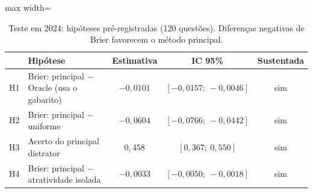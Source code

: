 \begin{table}[ht]
\centering
\caption{Teste em 2024: hipóteses pré-registradas (120 questões). Diferenças negativas de Brier favorecem o método principal.}\label{tab:hipoteses}
\small
\begin{adjustbox}{max width=\linewidth}
\begin{tabular}{llccc}
\toprule
 & Hipótese & Estimativa & IC 95\% & Sustentada \\
\midrule
H1 & Brier: principal $-$ Oracle (usa o gabarito) & $-0{,}0101$ & $[-0{,}0157;\ -0{,}0046]$ & sim \\
H2 & Brier: principal $-$ uniforme & $-0{,}0604$ & $[-0{,}0766;\ -0{,}0442]$ & sim \\
H3 & Acerto do principal distrator & $0{,}458$ & $[0{,}367;\ 0{,}550]$ & sim \\
H4 & Brier: principal $-$ atratividade isolada & $-0{,}0033$ & $[-0{,}0050;\ -0{,}0018]$ & sim \\
\bottomrule
\end{tabular}
\end{adjustbox}
\end{table}
